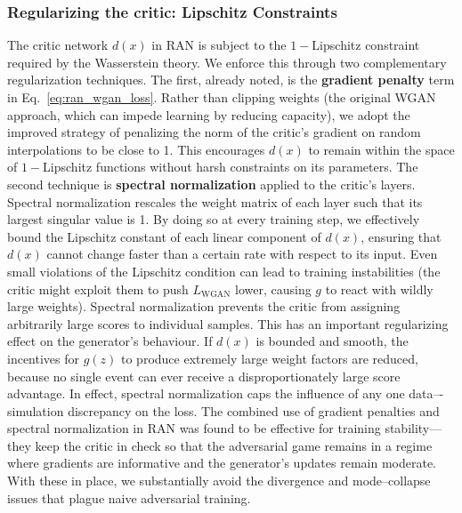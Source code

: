         \subsubsection{Regularizing the critic: Lipschitz Constraints}
            The critic network $d(x)$ in RAN is subject to the \(1-\)Lipschitz constraint required by the Wasserstein theory.
            We enforce this through two complementary regularization techniques.
            The first, already noted, is the \textbf{gradient penalty} term in Eq.~\eqref{eq:ran_wgan_loss}.
            Rather than clipping weights (the original WGAN approach, which can impede learning by reducing capacity), we adopt the improved strategy of penalizing the norm of the critic’s gradient on random interpolations to be close to 1.\kd{}
            This encourages $d(x)$ to remain within the space of \(1-\)Lipschitz functions without harsh constraints on its parameters.
            The second technique is \textbf{spectral normalization} applied to the critic’s layers.\kd{}
            Spectral normalization rescales the weight matrix of each layer such that its largest singular value is 1.
            By doing so at every training step, we effectively bound the Lipschitz constant of each linear component of $d(x)$, ensuring that $d(x)$ cannot change faster than a certain rate with respect to its input.\kd{}
            Even small violations of the Lipschitz condition can lead to training instabilities (the critic might exploit them to push $L_{\text{WGAN}}$ lower, causing $g$ to react with wildly large weights).
            Spectral normalization prevents the critic from assigning arbitrarily large scores to individual samples.\kd{}
            This has an important regularizing effect on the generator’s behaviour.
            If $d(x)$ is bounded and smooth, the incentives for $g(z)$ to produce extremely large weight factors are reduced, because no single event can ever receive a disproportionately large score advantage.
            In effect, spectral normalization caps the influence of any one data–-simulation discrepancy on the loss.
            The combined use of gradient penalties and spectral normalization in RAN was found to be effective for training stability---they keep the critic in check so that the adversarial game remains in a regime where gradients are informative and the generator’s updates remain moderate.
            With these in place, we substantially avoid the divergence and mode--collapse issues that plague naive adversarial training.\kd{}


